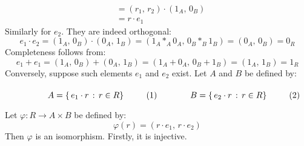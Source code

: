 \documentclass[crop=false,class=article]{standalone}                       %
\begin{document}
\begin{solution}
\begin{subequations}
\begin{align}
                    &=(r_{1},\,r_{2})\cdot(1_{A},\,0_{B})\\
                    &=r\cdot{e}_{1}
                \end{align}
            \end{subequations}
            Similarly for $e_{2}$. They are indeed orthogonal:
            \begin{equation}
                e_{1}\cdot{e}_{2}
                =(1_{A},\,0_{B})\cdot(0_{A},\,1_{B})
                =(1_{A}*_{A}0_{A},\,0_{B}*_{B}1_{B})
                =(0_{A},\,0_{B})
                =0_{R}
            \end{equation}
            Completeness follows from:
            \begin{equation}
                e_{1}+e_{1}
                =(1_{A},\,0_{B})+(0_{A},\,1_{B})
                =(1_{A}+0_{A},\,0_{B}+1_{B})
                =(1_{A},\,1_{B})
                =1_{R}
            \end{equation}
            Conversely, suppose such elements $e_{1}$ and $e_{2}$ exist.
            Let $A$ and $B$ be defined by:
            \par\hfill\par
            \begin{subequations}
                \begin{minipage}[b]{0.49\textwidth}
                    \begin{equation}
                        A=\{\,e_{1}\cdot{r}\,:\,r\in{R}\}
                    \end{equation}
                \end{minipage}
                \hfill
                \begin{minipage}[b]{0.49\textwidth}
                    \begin{equation}
                        B=\{\,e_{2}\cdot{r}\,:\,r\in{R}\}
                    \end{equation}
                \end{minipage}
            \end{subequations}
            \par\vspace{2.5ex}
            Let $\varphi:R\rightarrow{A}\times{B}$ be defined by:
            \begin{equation}
                \varphi(r)=(r\cdot{e}_{1},\,r\cdot{e}_{2})
            \end{equation}
            Then $\varphi$ is an isomorphism. Firstly, it is injective.

\end{solution}
\end{document}
